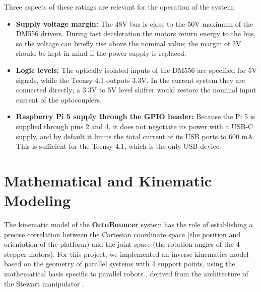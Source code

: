 \documentclass[12pt,a4paper]{report}
\begin{document}
Three aspects of these ratings are relevant for the operation of the system:
\begin{itemize}
    \item \textbf{Supply voltage margin:} The 48V bus is close to the 50V maximum of the DM556 drivers. During fast deceleration the motors return energy to the bus, so the voltage can briefly rise above the nominal value; the margin of 2V should be kept in mind if the power supply is replaced.
    \item \textbf{Logic levels:} The optically isolated inputs of the DM556 are specified for 5V signals, while the Teensy 4.1 outputs 3.3V. In the current system they are connected directly; a 3.3V to 5V level shifter would restore the nominal input current of the optocouplers.
    \item \textbf{Raspberry Pi 5 supply through the GPIO header:} Because the Pi 5 is supplied through pins 2 and 4, it does not negotiate its power with a USB-C supply, and by default it limits the total current of its USB ports to 600 mA. This is sufficient for the Teensy 4.1, which is the only USB device.
\end{itemize}

\chapter{Mathematical and Kinematic Modeling}
\label{chap:cinematica}

The kinematic model of the \textbf{OctoBouncer} system has the role of establishing a precise correlation between the Cartesian coordinate space (the position and orientation of the platform) and the joint space (the rotation angles of the 4 stepper motors). For this project, we implemented an inverse kinematics model based on the geometry of parallel systems with 4 support points, using the mathematical basis specific to parallel robots \cite{parallel_robot}, derived from the architecture of the Stewart manipulator \cite{ik_stewart}.
\end{document}
